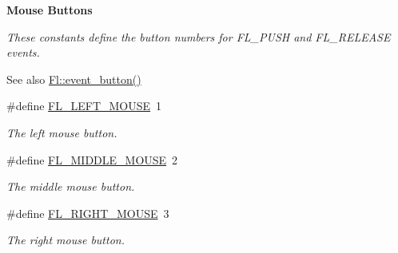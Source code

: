 \begin{Indent}\textbf{ Mouse Buttons}\par
{\em These constants define the button numbers for F\+L\+\_\+\+P\+U\+SH and F\+L\+\_\+\+R\+E\+L\+E\+A\+SE events.

\begin{DoxySeeAlso}{See also}
\hyperlink{group__fl__events_ga7ae6d99ceb1a2afb8a1dc4455ac941cd}{Fl\+::event\+\_\+button()} 
\end{DoxySeeAlso}
}\begin{DoxyCompactItemize}
\item 
\#define \hyperlink{_enumerations_8_h_a33b6ebe3faf691660603b03bf4bbeeb8}{F\+L\+\_\+\+L\+E\+F\+T\+\_\+\+M\+O\+U\+SE}~1
\begin{DoxyCompactList}\small\item\em The left mouse button. \end{DoxyCompactList}\item 
\#define \hyperlink{_enumerations_8_h_a88d6920f2af6a9c2b48be02e5270d097}{F\+L\+\_\+\+M\+I\+D\+D\+L\+E\+\_\+\+M\+O\+U\+SE}~2
\begin{DoxyCompactList}\small\item\em The middle mouse button. \end{DoxyCompactList}\item 
\#define \hyperlink{_enumerations_8_h_ace3b88a65f6aabab96b0bcc411470c77}{F\+L\+\_\+\+R\+I\+G\+H\+T\+\_\+\+M\+O\+U\+SE}~3
\begin{DoxyCompactList}\small\item\em The right mouse button. \end{DoxyCompactList}\end{DoxyCompactItemize}
\end{Indent}
